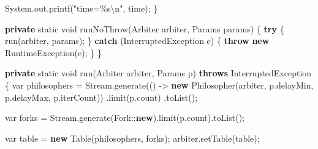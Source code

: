 \documentclass[11pt]{article}
\newenvironment{Shaded}{}{}
\newcommand{\KeywordTok}[1]{\textcolor[rgb]{0.00,0.44,0.13}{\textbf{{#1}}}}
\newcommand{\DataTypeTok}[1]{\textcolor[rgb]{0.56,0.13,0.00}{{#1}}}
\newcommand{\StringTok}[1]{\textcolor[rgb]{0.25,0.44,0.63}{{#1}}}
\newcommand{\FunctionTok}[1]{\textcolor[rgb]{0.02,0.16,0.49}{{#1}}}
\newcommand{\NormalTok}[1]{{#1}}
\newcommand{\SpecialCharTok}[1]{\textcolor[rgb]{0.25,0.44,0.63}{{#1}}}
\newcommand{\ControlFlowTok}[1]{\textcolor[rgb]{0.00,0.44,0.13}{\textbf{{#1}}}}
\newcommand{\OperatorTok}[1]{\textcolor[rgb]{0.40,0.40,0.40}{{#1}}}
\newcommand{\BuiltInTok}[1]{{#1}}
\begin{document}
\begin{Shaded}
\begin{Highlighting}[]
        \BuiltInTok{System}\OperatorTok{.}\FunctionTok{out}\OperatorTok{.}\FunctionTok{printf}\OperatorTok{(}\StringTok{"time=}\SpecialCharTok{\%s\textbackslash{}n}\StringTok{"}\OperatorTok{,}\NormalTok{ time}\OperatorTok{);}
    \OperatorTok{\}}

    \KeywordTok{private} \DataTypeTok{static} \DataTypeTok{void} \FunctionTok{runNoThrow}\OperatorTok{(}\NormalTok{Arbiter arbiter}\OperatorTok{,}\NormalTok{ Params params}\OperatorTok{)} \OperatorTok{\{}
        \ControlFlowTok{try} \OperatorTok{\{}
            \FunctionTok{run}\OperatorTok{(}\NormalTok{arbiter}\OperatorTok{,}\NormalTok{ params}\OperatorTok{);}
        \OperatorTok{\}} \ControlFlowTok{catch} \OperatorTok{(}\BuiltInTok{InterruptedException}\NormalTok{ e}\OperatorTok{)} \OperatorTok{\{}
            \ControlFlowTok{throw} \KeywordTok{new} \BuiltInTok{RuntimeException}\OperatorTok{(}\NormalTok{e}\OperatorTok{);}
        \OperatorTok{\}}
    \OperatorTok{\}}

    \KeywordTok{private} \DataTypeTok{static} \DataTypeTok{void} \FunctionTok{run}\OperatorTok{(}\NormalTok{Arbiter arbiter}\OperatorTok{,}\NormalTok{ Params p}\OperatorTok{)} \KeywordTok{throws} \BuiltInTok{InterruptedException} \OperatorTok{\{}
        \DataTypeTok{var}\NormalTok{ philosophers }\OperatorTok{=}\NormalTok{ Stream}\OperatorTok{.}\FunctionTok{generate}\OperatorTok{(()} \OperatorTok{{-}\textgreater{}}
            \KeywordTok{new} \FunctionTok{Philosopher}\OperatorTok{(}\NormalTok{arbiter}\OperatorTok{,}\NormalTok{ p}\OperatorTok{.}\FunctionTok{delayMin}\OperatorTok{,}\NormalTok{ p}\OperatorTok{.}\FunctionTok{delayMax}\OperatorTok{,}\NormalTok{ p}\OperatorTok{.}\FunctionTok{iterCount}\OperatorTok{))}
                \OperatorTok{.}\FunctionTok{limit}\OperatorTok{(}\NormalTok{p}\OperatorTok{.}\FunctionTok{count}\OperatorTok{)}
                \OperatorTok{.}\FunctionTok{toList}\OperatorTok{();}

        \DataTypeTok{var}\NormalTok{ forks }\OperatorTok{=}\NormalTok{ Stream}\OperatorTok{.}\FunctionTok{generate}\OperatorTok{(}\NormalTok{Fork}\OperatorTok{::}\KeywordTok{new}\OperatorTok{).}\FunctionTok{limit}\OperatorTok{(}\NormalTok{p}\OperatorTok{.}\FunctionTok{count}\OperatorTok{).}\FunctionTok{toList}\OperatorTok{();}

        \DataTypeTok{var}\NormalTok{ table }\OperatorTok{=} \KeywordTok{new} \FunctionTok{Table}\OperatorTok{(}\NormalTok{philosophers}\OperatorTok{,}\NormalTok{ forks}\OperatorTok{);}
\NormalTok{        arbiter}\OperatorTok{.}\FunctionTok{setTable}\OperatorTok{(}\NormalTok{table}\OperatorTok{);}


\end{Highlighting}
\end{Shaded}
\end{document}
